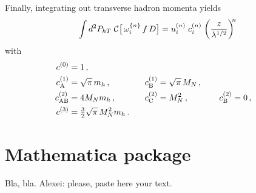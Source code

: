 \documentclass[a4paper,11pt]{article}
\newcommand{\red}[1]{{\color{red} #1}}
\newcommand{\be}{\begin{equation}}
\newcommand{\ee}{\end{equation}}
\def\Phperp{P_{hT}}
\newcommand*{\BibPath}{.}%
\begin{document}
Finally, integrating out transverse hadron momenta yields
\be
	\int d^2\Phperp\;
	{\cal C}\bigl[\,\omega^{\{n\}}_{i} \, f \, D \bigr] 
	= u^{(n)}_{i} \;c^{(n)}_{i}\;\biggl(\frac{z}{\lambda^{1/2}}\biggr)^{\!\!n}
\ee
with
\begin{alignat}{7}
	c^{(0)}_{\rm  } 	&= 1 \, , \\
	c^{(1)}_{\rm A} 	&= \sqrt{\pi}\,m_h	\, , &
	c^{(1)}_{\rm B} 	&= \sqrt{\pi}\,M_N	\, , \\
	c^{(2)}_{\rm AB} 	&= 4M_Nm_h		\, , \;\;\;\;\;\; & 
	c^{(2)}_{\rm C} 	&= M_N^2 		\, , \;\;\;\;\;\;\;\;\;\; & 
	c^{(2)}_{\rm B}	&= 0 			\, ,\\
	c^{(3)}_{\rm  } 	&= {\textstyle\frac32}\sqrt{\pi} \,M_N^2m_h 
	\, . \;\;\;     &
			&
	\label{Eq:Gaussian-integrals-working-IV}
\end{alignat}

\newpage
\section{Mathematica package}
\label{app:package}

Bla, bla. \red{Alexei: please, paste here your text.}


\newpage

\end{document}

